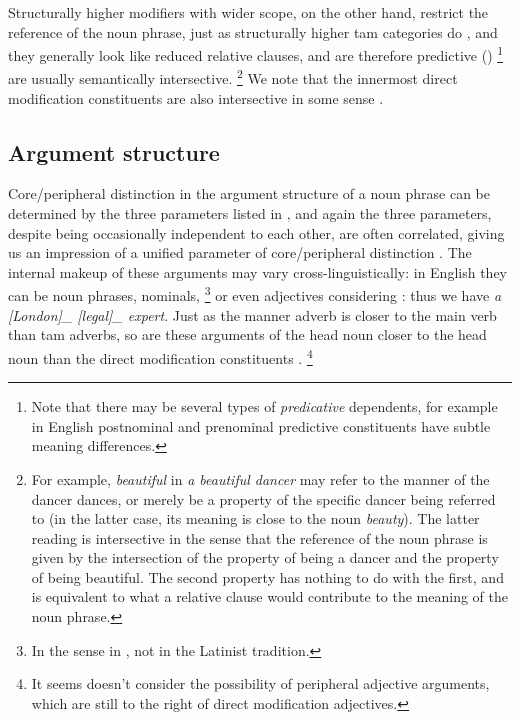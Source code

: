 \documentclass[a4paper, oneside, 12pt]{report}
\newcommand*{\citechap}[1]{chap.~{#1}}
\newcommand*{\citepage}[1]{p.~{#1}}
\newcommand*{\citepages}[1]{pp.~{#1}}
\newcommand*{\term}[1]{\emph{#1}}
\newcommand{\form}[1]{\emph{#1}}
\begin{document}
Structurally higher modifiers with wider scope, on the other hand, restrict the reference of the noun phrase,
just as structurally higher \ac{tam} categories do
\citep[\citepages{23,25}]{cinque2010syntax},
and they generally look like reduced relative clauses,
and are therefore predictive
(\citealt[\citechap{5}]{cinque2010syntax})%
\footnote{
    Note that there may be several types of \term{predicative} dependents,
    for example in English postnominal and prenominal predictive constituents have subtle meaning differences.
}
are usually semantically intersective.%
\footnote{
    For example, \form{beautiful} in \form{a beautiful dancer}
    may refer to the manner of the dancer dances,
    or merely be a property of the specific dancer being referred to
    (in the latter case, its meaning is close to the noun \form{beauty}).
    The latter reading is intersective in the sense
    that the reference of the noun phrase is given by the intersection
    of the property of being a dancer and the property of being beautiful. 
    The second property has nothing to do with the first,
    and is equivalent to what a relative clause would contribute to the meaning of the noun phrase.
}
We note that the innermost direct modification constituents are also intersective in some sense 
\citep[\citepage{476}]{devine2006latin}.

\subsection{Argument structure}\label{sec:grammatical.np.core}

Core/peripheral distinction in the argument structure of a noun phrase can be determined 
by the three parameters listed in ,
and again the three parameters, despite being occasionally independent to each other,
are often correlated,
giving us an impression of a unified parameter of core/peripheral distinction
\citep[\citepages{439-443}]{cgel}.
The internal makeup of these arguments may vary cross-linguistically:
in English they can be noun phrases, nominals,%
\footnote{
    In the sense in \citet{cgel}, not in the Latinist tradition.
}
or even adjectives considering \citep[\citepages{439-440}]{cgel}: thus we have \form{a [London]_{} [legal]_{\text{argument}} expert}.
Just as the manner adverb is closer to the main verb than \ac{tam} adverbs,
so are these arguments of the head noun closer to the head noun
than the direct modification constituents \citep[\citepage{452}, {[2]}]{cgel}.%
\footnote{
    It seems \citet{cgel} doesn't consider the possibility of peripheral adjective arguments,
    which are still to the right of direct modification adjectives.
}
\end{document}
